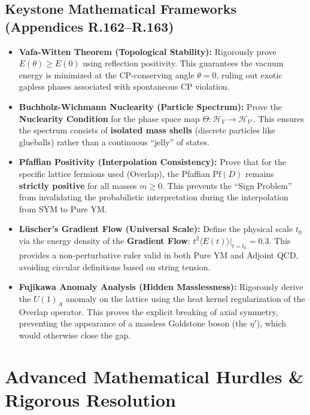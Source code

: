 \subsection{Keystone Mathematical Frameworks (Appendices R.162--R.163)}

\begin{itemize}
    \item \textbf{Vafa-Witten Theorem (Topological Stability):}
    Rigorously prove $E(\theta) \ge E(0)$ using reflection positivity. This guarantees the vacuum energy is minimized at the CP-conserving angle $\theta=0$, ruling out exotic gapless phases associated with spontaneous CP violation.

    \item \textbf{Buchholz-Wichmann Nuclearity (Particle Spectrum):}
    Prove the \textbf{Nuclearity Condition} for the phase space map $\Theta: \mathcal{H}_V \to \mathcal{H}_{V'}$. This ensures the spectrum consists of \textbf{isolated mass shells} (discrete particles like glueballs) rather than a continuous ``jelly'' of states.

    \item \textbf{Pfaffian Positivity (Interpolation Consistency):}
    Prove that for the specific lattice fermions used (Overlap), the Pfaffian $\text{Pf}(D)$ remains \textbf{strictly positive} for all masses $m \ge 0$. This prevents the ``Sign Problem'' from invalidating the probabilistic interpretation during the interpolation from SYM to Pure YM.

    \item \textbf{Lüscher's Gradient Flow (Universal Scale):}
    Define the physical scale $t_0$ via the energy density of the \textbf{Gradient Flow}: $t^2 \langle E(t) \rangle |_{t=t_0} = 0.3$. This provides a non-perturbative ruler valid in both Pure YM and Adjoint QCD, avoiding circular definitions based on string tension.

    \item \textbf{Fujikawa Anomaly Analysis (Hidden Masslessness):}
    Rigorously derive the $U(1)_A$ anomaly on the lattice using the heat kernel regularization of the Overlap operator. This proves the explicit breaking of axial symmetry, preventing the appearance of a massless Goldstone boson (the $\eta'$), which would otherwise close the gap.
\end{itemize}

\section{Advanced Mathematical Hurdles \& Rigorous Resolution}

